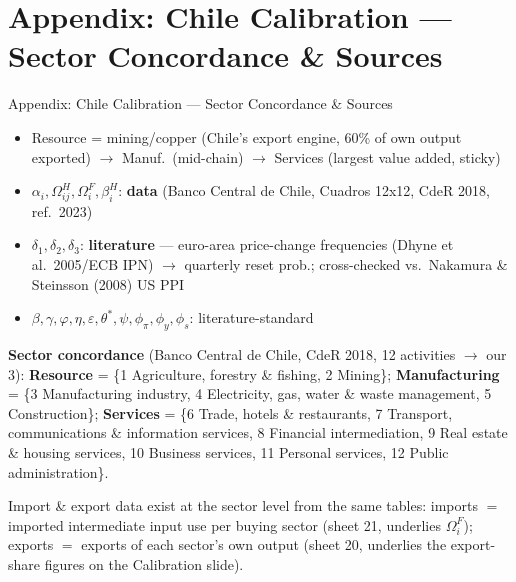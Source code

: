 \appendix
\section*{Appendix: Chile Calibration --- Sector Concordance \& Sources}
\begin{frame}{Appendix: Chile Calibration --- Sector Concordance \& Sources}

{\scriptsize
\begin{itemize}\setlength{\itemsep}{2pt}
\item Resource = mining/copper (Chile's export engine, 60\% of own output exported) $\to$ Manuf.\ (mid-chain) $\to$ Services (largest value added, sticky)
\item $\alpha_i,\Omega^H_{ij},\Omega^F_i,\beta^H_i$: \textbf{data} (Banco Central de Chile, Cuadros 12x12, CdeR 2018, ref.\ 2023)
\item $\delta_1,\delta_2,\delta_3$: \textbf{literature} --- euro-area price-change frequencies (Dhyne et al.\ 2005/ECB IPN) $\to$ quarterly reset prob.; cross-checked vs.\ Nakamura \& Steinsson (2008) US PPI
\item $\beta,\gamma,\varphi,\eta,\varepsilon,\theta^*,\psi,\phi_\pi,\phi_y,\phi_s$: literature-standard
\end{itemize}}

\vspace{4pt}
{\scriptsize \textbf{Sector concordance} (Banco Central de Chile, CdeR 2018, 12 activities $\to$ our 3): \textbf{Resource} = \{1 Agriculture, forestry \& fishing, 2 Mining\}; \textbf{Manufacturing} = \{3 Manufacturing industry, 4 Electricity, gas, water \& waste management, 5 Construction\}; \textbf{Services} = \{6 Trade, hotels \& restaurants, 7 Transport, communications \& information services, 8 Financial intermediation, 9 Real estate \& housing services, 10 Business services, 11 Personal services, 12 Public administration\}.}

\vspace{3pt}
{\scriptsize Import \& export data exist at the sector level from the same tables: imports $=$ imported intermediate input use per buying sector (sheet 21, underlies $\Omega^F_i$); exports $=$ exports of each sector's own output (sheet 20, underlies the export-share figures on the Calibration slide).}

\end{frame}


